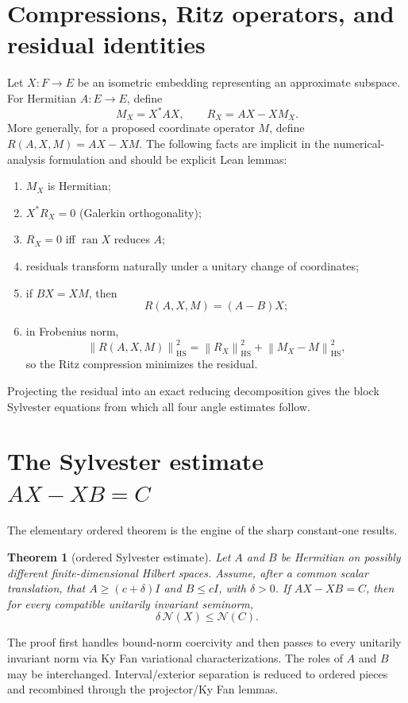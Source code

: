 \documentclass[11pt]{article}
\newcommand{\Nn}{\mathcal N}
\newcommand{\ran}{\operatorname{ran}}
\newcommand{\HS}{\mathrm{HS}}
\newcommand{\norm}[1]{\left\lVert#1\right\rVert}
\newtheorem{theorem}{Theorem}[section]
\theoremstyle{remark}
\begin{document}
\section{Compressions, Ritz operators, and residual identities}

Let \(X:F\to E\) be an isometric embedding representing an approximate
subspace.  For Hermitian \(A:E\to E\), define
\[
  M_X=X^*AX,\qquad R_X=AX-XM_X.
\]
More generally, for a proposed coordinate operator \(M\), define
\(R(A,X,M)=AX-XM\).  The following facts are implicit in the numerical-analysis
formulation and should be explicit Lean lemmas:
\begin{enumerate}
\item \(M_X\) is Hermitian;
\item \(X^*R_X=0\) (Galerkin orthogonality);
\item \(R_X=0\) iff \(\ran X\) reduces \(A\);
\item residuals transform naturally under a unitary change of coordinates;
\item if \(BX=XM\), then
\[
  R(A,X,M)=(A-B)X;
\]
\item in Frobenius norm,
\[
  \norm{R(A,X,M)}_{\HS}^2
  =\norm{R_X}_{\HS}^2+\norm{M_X-M}_{\HS}^2,
\]
so the Ritz compression minimizes the residual.
\end{enumerate}

Projecting the residual into an exact reducing decomposition gives the block
Sylvester equations from which all four angle estimates follow.

\section{The Sylvester estimate \texorpdfstring{$AX-XB=C$}{AX-XB=C}}

The elementary ordered theorem is the engine of the sharp constant-one
results.

\begin{theorem}[ordered Sylvester estimate]
Let \(A\) and \(B\) be Hermitian on possibly different finite-dimensional
Hilbert spaces.  Assume, after a common scalar translation, that
\(A\ge(c+\delta)I\) and \(B\le cI\), with \(\delta>0\).  If
\(AX-XB=C\), then for every compatible unitarily invariant seminorm,
\[
  \delta\,\Nn(X)\le\Nn(C).
\]
\end{theorem}

The proof first handles bound-norm coercivity and then passes to every
unitarily invariant norm via Ky Fan variational characterizations.  The roles
of \(A\) and \(B\) may be interchanged.  Interval/exterior separation is
reduced to ordered pieces and recombined through the projector/Ky Fan lemmas.
\end{document}
